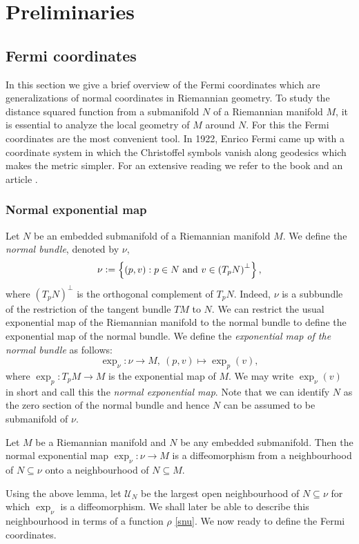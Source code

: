 \chapter[Preliminaries]{Preliminaries} \label{ch:preliminaries}
\setcounter{mtc}{6}
\minitoc
\section{Fermi coordinates}\label{Sec:FermiCoordinates}
\hfb In this section we give a brief overview of the Fermi coordinates which are generalizations of normal coordinates in Riemannian geometry. To study the distance squared function from a submanifold $N$ of a Riemannian manifold $M$, it is essential to analyze the local geometry of $M$ around $N$. For this the Fermi coordinates are the most convenient tool. In 1922, Enrico Fermi \cite{Fer22} came up  with a coordinate system in which the Christoffel symbols vanish along geodesics which makes the metric simpler. For an extensive reading we refer to the book \cite[Chapter 2]{Gr04} and an article \cite{MaMi63}.

\subsection{Normal exponential map} 
\hfb Let $N$ be an embedded submanifold of a Riemannian manifold $M$. We define the \textit{normal bundle}, denoted by $\nu$,
\begin{displaymath}
    \nu \defeq \left\{(p,v):p\in N\text{ and } v\in \left(T_pN\right)^\perp\right\}, \index{$\nu$}
\end{displaymath}
where $(T_pN)^\perp$ is the orthogonal complement of $T_pN$. Indeed, $\nu$ is a subbundle of the restriction of the tangent bundle $TM$ to $N$. We can restrict the usual exponential map of the Riemannian manifold to the normal bundle to define the exponential map of the normal bundle. We define the \textit{exponential map of the normal bundle} as follows:\index{$\exp_{\nu}$}
\begin{equation}\label{eq:normalExponentialMap}
    \exp_\nu:\nu\to M,~(p,v)\mapsto \exp_p(v),
\end{equation} 
where $\exp_p:T_pM\to M$ is the exponential map of $M$. We may write $\exp_\nu(v)$ in short and call this the \textit{normal exponential map}. Note that we can identify $N$ as the zero section of the normal bundle and hence $N$ can be assumed to be submanifold of $\nu$. 
\begin{lemma}\cite[Lemma 2.3]{Gr04}
    Let $M$ be a Riemannian manifold and $N$ be any embedded submanifold. Then the normal exponential map $\exp_\nu:\nu\to M$ is a diffeomorphism from a neighbourhood of $N\subseteq \nu$ onto a neighbourhood of $N\subseteq M$. 
\end{lemma}
\bigskip
Using the above lemma, let $\mathcal{U}_N$ be the largest open neighbourhood of $N\subseteq \nu$ for which $\exp_\nu$ is a diffeomorphism. We shall later be able to describe this neighbourhood in terms of a function $\rho$ \eqref{snu}. We now ready to define the Fermi coordinates. 

